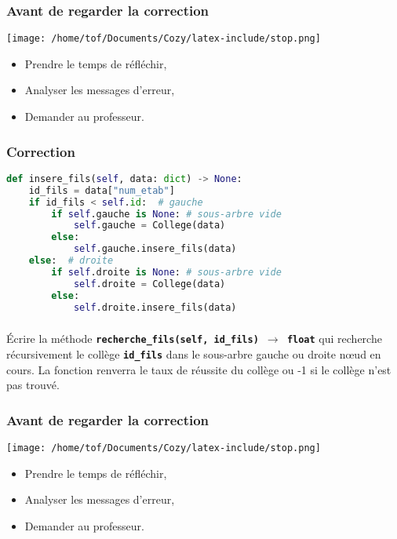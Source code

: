 \documentclass[svgnames,11pt]{beamer}
\begin{document}
\begin{frame}
    \frametitle{Avant de regarder la correction}
\begin{center}
    \centering
    \texttt{[image: /home/tof/Documents/Cozy/latex-include/stop.png]}
    \end{center}
{\Large
    \begin{itemize}
        \item Prendre le temps de réfléchir,
        \item Analyser les messages d'erreur,
        \item Demander au professeur.
    \end{itemize}
}
\end{frame}
\begin{frame}[fragile]
    \frametitle{Correction}

\begin{center}
\begin{lstlisting}[language=Python , basicstyle=\ttfamily\small, xleftmargin=.5em, xrightmargin=0em]
def insere_fils(self, data: dict) -> None:
    id_fils = data["num_etab"]
    if id_fils < self.id:  # gauche
        if self.gauche is None: # sous-arbre vide
            self.gauche = College(data)
        else:
            self.gauche.insere_fils(data)
    else:  # droite
        if self.droite is None: # sous-arbre vide
            self.droite = College(data)
        else:
            self.droite.insere_fils(data)
\end{lstlisting}
\end{center}    

\end{frame}
\begin{frame}
    \frametitle{}

    \begin{activite}
    Écrire la méthode \textbf{\texttt{recherche\_fils(self, id\_fils) $\rightarrow$ float}} qui recherche récursivement le collège \textbf{\texttt{id\_fils}} dans le sous-arbre gauche ou droite nœud en cours. La fonction renverra le taux de réussite du collège ou -1 si le collège n'est pas trouvé.
    \end{activite}

\end{frame}
\begin{frame}
    \frametitle{Avant de regarder la correction}
\begin{center}
    \centering
    \texttt{[image: /home/tof/Documents/Cozy/latex-include/stop.png]}
    \end{center}
{\Large
    \begin{itemize}
        \item Prendre le temps de réfléchir,
        \item Analyser les messages d'erreur,
        \item Demander au professeur.
    \end{itemize}
}
\end{frame}
\end{document}
